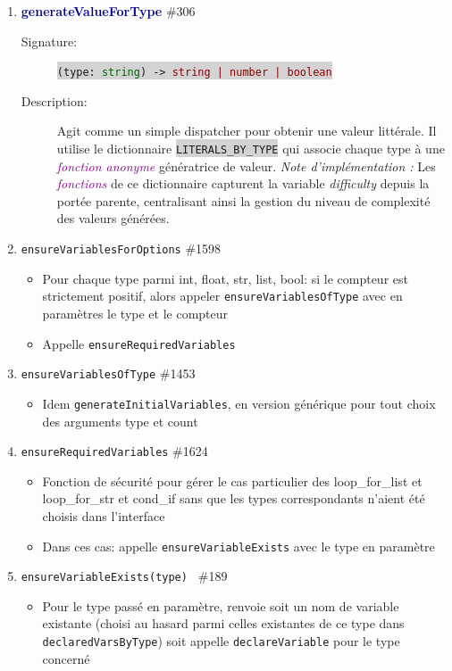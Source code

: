 \documentclass[11pt,a4paper]{article}
\newcommand{\code}[1]{\colorbox{lightgray}{\texttt{\small #1}}}
\newcommand{\var}[1]{\textit{#1}}
\newcommand{\vartype}[1]{\textcolor{darkgreen}{#1}}
\newcommand{\methodname}[1]{\textbf{\textcolor{darkblue}{#1}}}
\newcommand{\param}[1]{\code{#1}}
\newcommand{\rettype}[1]{\textcolor{darkred}{#1}}
\newcommand{\jsfunc}[1]{\textcolor{purple}{\textit{#1}}}
\begin{document}
\begin{enumerate}
    \item \methodname{generateValueForType} \#306
\begin{description}
    \item[Signature:] \code{(\param{type}: \vartype{string}) -> \rettype{string | number | boolean}}
    \item[Description:] Agit comme un simple dispatcher pour obtenir une valeur littérale. Il utilise le dictionnaire \code{LITERALS\_BY\_TYPE} qui associe chaque type à une \jsfunc{fonction anonyme} génératrice de valeur.
    \textit{Note d'implémentation :} Les \jsfunc{fonctions} de ce dictionnaire capturent la variable \var{difficulty} depuis la portée parente, centralisant ainsi la gestion du niveau de complexité des valeurs générées.
\end{description} 
    
    \item \texttt{ensureVariablesForOptions} \#1598
    \begin{itemize}
        \item Pour chaque type parmi int, float, str, list, bool: si le compteur est strictement positif, alors appeler \texttt{ensureVariablesOfType} avec en paramètres le type et le compteur 
        \item Appelle \texttt{ensureRequiredVariables}
    \end{itemize}

    \item \texttt{ensureVariablesOfType} \#1453
    \begin{itemize}
        \item Idem \texttt{generateInitialVariables}, en version générique pour tout choix des arguments type et count
    \end{itemize}

    \item \texttt{ensureRequiredVariables} \#1624
    \begin{itemize}
        \item Fonction de sécurité pour gérer le cas particulier des loop\_for\_list et loop\_for\_str et cond\_if sans que les types correspondants n'aient été choisis dans l'interface
        \item Dans ces cas: appelle \texttt{ensureVariableExists} avec le type en paramètre
    \end{itemize}

    \item \texttt{ensureVariableExists(type) } \#189
    \begin{itemize}
        \item Pour le type passé en paramètre, renvoie soit un nom de variable existante (choisi au hasard parmi celles existantes de ce type dans \texttt{declaredVarsByType}) soit appelle \texttt{declareVariable} pour le type concerné
    \end{itemize}


\end{enumerate}
\end{document}
